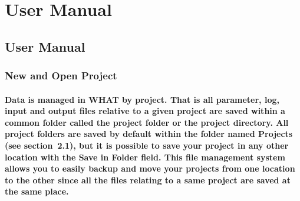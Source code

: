 \documentclass[10pt, letterpaper, fleqn]{report}
\begin{document}
\section{User Manual}
\subsection{User Manual}
\subsubsection{New and Open Project}
\paragraph{Data is managed in WHAT by project.
That is all parameter, log, input and output files relative to a given project are saved within a common folder called the project folder or the project directory.
All project folders are saved by default within the folder named Projects (see section 2.1), but it is possible to save your project in any other location with the Save in Folder field.
This file management system allows you to easily backup and move your projects from one location to the other since all the files relating to a same project are saved at the same place.
}
\end{document}
